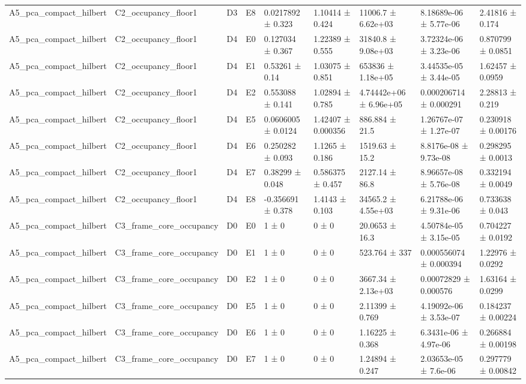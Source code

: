 \begin{table}
\begin{tabular}{lllllllll}
A5\_pca\_compact\_hilbert & C2\_occupancy\_floor1 & D3 & E8 & 0.0217892 ± 0.323 & 1.10414 ± 0.424 & 11006.7 ± 6.62e+03 & 8.18689e-06 ± 5.77e-06 & 2.41816 ± 0.174 \\
A5\_pca\_compact\_hilbert & C2\_occupancy\_floor1 & D4 & E0 & 0.127034 ± 0.367 & 1.22389 ± 0.555 & 31840.8 ± 9.08e+03 & 3.72324e-06 ± 3.23e-06 & 0.870799 ± 0.0851 \\
A5\_pca\_compact\_hilbert & C2\_occupancy\_floor1 & D4 & E1 & 0.53261 ± 0.14 & 1.03075 ± 0.851 & 653836 ± 1.18e+05 & 3.44535e-05 ± 3.44e-05 & 1.62457 ± 0.0959 \\
A5\_pca\_compact\_hilbert & C2\_occupancy\_floor1 & D4 & E2 & 0.553088 ± 0.141 & 1.02894 ± 0.785 & 4.74442e+06 ± 6.96e+05 & 0.000206714 ± 0.000291 & 2.28813 ± 0.219 \\
A5\_pca\_compact\_hilbert & C2\_occupancy\_floor1 & D4 & E5 & 0.0606005 ± 0.0124 & 1.42407 ± 0.000356 & 886.884 ± 21.5 & 1.26767e-07 ± 1.27e-07 & 0.230918 ± 0.00176 \\
A5\_pca\_compact\_hilbert & C2\_occupancy\_floor1 & D4 & E6 & 0.250282 ± 0.093 & 1.1265 ± 0.186 & 1519.63 ± 15.2 & 8.8176e-08 ± 9.73e-08 & 0.298295 ± 0.0013 \\
A5\_pca\_compact\_hilbert & C2\_occupancy\_floor1 & D4 & E7 & 0.38299 ± 0.048 & 0.586375 ± 0.457 & 2127.14 ± 86.8 & 8.96657e-08 ± 5.76e-08 & 0.332194 ± 0.0049 \\
A5\_pca\_compact\_hilbert & C2\_occupancy\_floor1 & D4 & E8 & -0.356691 ± 0.378 & 1.4143 ± 0.103 & 34565.2 ± 4.55e+03 & 6.21788e-06 ± 9.31e-06 & 0.733638 ± 0.043 \\
A5\_pca\_compact\_hilbert & C3\_frame\_core\_occupancy & D0 & E0 & 1 ± 0 & 0 ± 0 & 20.0653 ± 16.3 & 4.50784e-05 ± 3.15e-05 & 0.704227 ± 0.0192 \\
A5\_pca\_compact\_hilbert & C3\_frame\_core\_occupancy & D0 & E1 & 1 ± 0 & 0 ± 0 & 523.764 ± 337 & 0.000556074 ± 0.000394 & 1.22976 ± 0.0292 \\
A5\_pca\_compact\_hilbert & C3\_frame\_core\_occupancy & D0 & E2 & 1 ± 0 & 0 ± 0 & 3667.34 ± 2.13e+03 & 0.00072829 ± 0.000576 & 1.63164 ± 0.0299 \\
A5\_pca\_compact\_hilbert & C3\_frame\_core\_occupancy & D0 & E5 & 1 ± 0 & 0 ± 0 & 2.11399 ± 0.769 & 4.19092e-06 ± 3.53e-07 & 0.184237 ± 0.00224 \\
A5\_pca\_compact\_hilbert & C3\_frame\_core\_occupancy & D0 & E6 & 1 ± 0 & 0 ± 0 & 1.16225 ± 0.368 & 6.3431e-06 ± 4.97e-06 & 0.266884 ± 0.00198 \\
A5\_pca\_compact\_hilbert & C3\_frame\_core\_occupancy & D0 & E7 & 1 ± 0 & 0 ± 0 & 1.24894 ± 0.247 & 2.03653e-05 ± 7.6e-06 & 0.297779 ± 0.00842 \\

\end{tabular}
\end{table}
